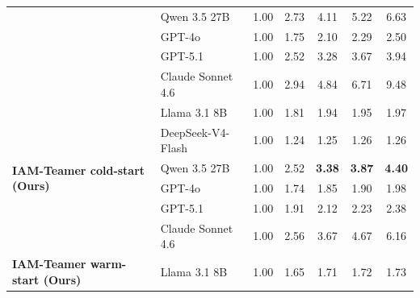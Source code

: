 \documentclass[a4paper,fleqn]{cas-sc}
\begin{document}
\begin{table}[t]
\begin{tabular}{llccccc}
                   & Qwen 3.5 27B      & 1.00                       & 2.73                       & 4.11                       & 5.22                       & 6.63                        \\
                   & GPT-4o            & 1.00                       & 1.75                       & 2.10                       & 2.29                       & 2.50                        \\
                   & GPT-5.1           & 1.00                       & 2.52                       & 3.28                       & 3.67                       & 3.94                        \\
                   & Claude Sonnet 4.6 & 1.00                       & 2.94                       & 4.84                       & 6.71                       & 9.48                        \\
    \midrule
    \multirow{6}{*}{\textbf{IAM-Teamer cold-start (Ours)}}
                   & Llama 3.1 8B      & 1.00                       & 1.81                       & 1.94                       & 1.95                       & 1.97                        \\
                   & DeepSeek-V4-Flash & 1.00                       & 1.24                       & 1.25                       & 1.26                       & 1.26                        \\
                   & Qwen 3.5 27B      & 1.00                       & 2.52                       & \textbf{3.38}              & \textbf{3.87}              & \textbf{4.40}               \\
                   & GPT-4o            & 1.00                       & 1.74                       & 1.85                       & 1.90                       & 1.98                        \\
                   & GPT-5.1           & 1.00                       & 1.91                       & 2.12                       & 2.23                       & 2.38                        \\
                   & Claude Sonnet 4.6 & 1.00                       & 2.56                       & 3.67                       & 4.67                       & 6.16                        \\
    \midrule
    \multirow{6}{*}{\textbf{IAM-Teamer warm-start (Ours)}}
                   & Llama 3.1 8B      & 1.00                       & 1.65                       & 1.71                       & 1.72                       & 1.73                        \\

\end{tabular}
\end{table}
\end{document}
